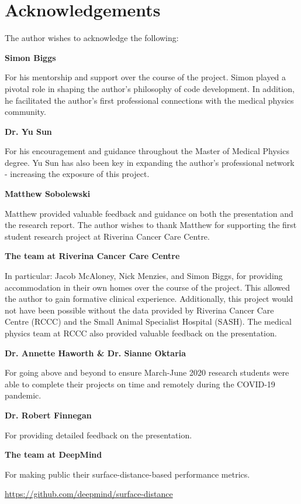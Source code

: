 \chapter{Acknowledgements}
\label{ch:acknowledgements}

The author wishes to acknowledge the following:

\textbf{Simon Biggs}

For his mentorship and support over the course of the project. Simon played a pivotal role
in shaping the author's philosophy of code development. In addition, he facilitated the
author's first professional connections with the medical physics community.

\textbf{Dr. Yu Sun}

For his encouragement and guidance throughout the Master of Medical Physics degree. Yu Sun has also been key in expanding the author's professional network - increasing the exposure of this project.

\textbf{Matthew Sobolewski}

Matthew provided valuable feedback and guidance on both the presentation and the research report. The author wishes to thank Matthew for supporting the first student research project at Riverina Cancer Care Centre.

\textbf{The team at Riverina Cancer Care Centre}

In particular: Jacob McAloney, Nick Menzies, and
Simon Biggs, for providing accommodation in their own homes over the course of
the project. This allowed the author to gain formative clinical experience. Additionally, this project would not have been possible without the data provided by Riverina Cancer Care Centre (RCCC) and the Small Animal Specialist Hospital (SASH). The medical physics team at RCCC also provided valuable feedback on the presentation.


\textbf{Dr. Annette Haworth \& Dr. Sianne Oktaria}

For going above and beyond to ensure March-June 2020 research students were able to complete their projects on time and remotely during the COVID-19 pandemic.

\textbf{Dr. Robert Finnegan}

For providing detailed feedback on the presentation.

\textbf{The team at DeepMind}

For making public their surface-distance-based performance metrics.

\url{https://github.com/deepmind/surface-distance}
